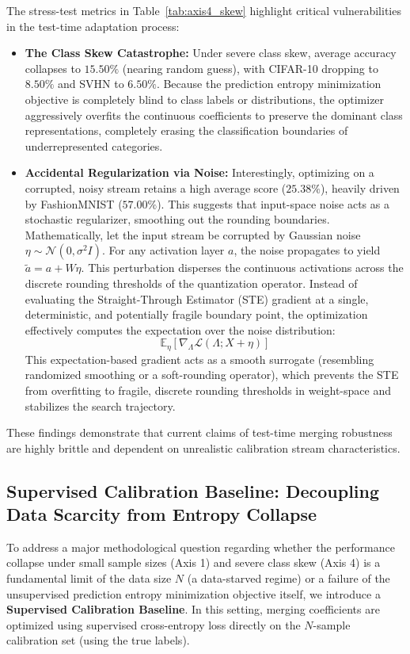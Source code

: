 The stress-test metrics in Table~\ref{tab:axis4_skew} highlight critical vulnerabilities in the test-time adaptation process:
\begin{itemize}
    \item \textbf{The Class Skew Catastrophe:} Under severe class skew, average accuracy collapses to $15.50\%$ (nearing random guess), with CIFAR-10 dropping to $8.50\%$ and SVHN to $6.50\%$. Because the prediction entropy minimization objective is completely blind to class labels or distributions, the optimizer aggressively overfits the continuous coefficients to preserve the dominant class representations, completely erasing the classification boundaries of underrepresented categories.
    \item \textbf{Accidental Regularization via Noise:} Interestingly, optimizing on a corrupted, noisy stream retains a high average score ($25.38\%$), heavily driven by FashionMNIST ($57.00\%$). This suggests that input-space noise acts as a stochastic regularizer, smoothing out the rounding boundaries. Mathematically, let the input stream be corrupted by Gaussian noise $\eta \sim \mathcal{N}(0, \sigma^2 I)$. For any activation layer $a$, the noise propagates to yield $\tilde{a} = a + W \eta$. This perturbation disperses the continuous activations across the discrete rounding thresholds of the quantization operator. Instead of evaluating the Straight-Through Estimator (STE) gradient at a single, deterministic, and potentially fragile boundary point, the optimization effectively computes the expectation over the noise distribution:
    \begin{equation}
        \mathbb{E}_{\eta} \left[ \nabla_{\Lambda} \mathcal{L}(\Lambda; X + \eta) \right]
    \end{equation}
    This expectation-based gradient acts as a smooth surrogate (resembling randomized smoothing or a soft-rounding operator), which prevents the STE from overfitting to fragile, discrete rounding thresholds in weight-space and stabilizes the search trajectory.
\end{itemize}
These findings demonstrate that current claims of test-time merging robustness are highly brittle and dependent on unrealistic calibration stream characteristics.

\subsection{Supervised Calibration Baseline: Decoupling Data Scarcity from Entropy Collapse}
\label{submission:sec:supervised_baseline}
To address a major methodological question regarding whether the performance collapse under small sample sizes (Axis 1) and severe class skew (Axis 4) is a fundamental limit of the data size $N$ (a data-starved regime) or a failure of the unsupervised prediction entropy minimization objective itself, we introduce a \textbf{Supervised Calibration Baseline}. In this setting, merging coefficients are optimized using supervised cross-entropy loss directly on the $N$-sample calibration set (using the true labels).

